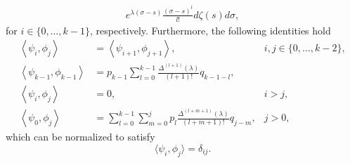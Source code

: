 \begin{proposition}
\begin{equation}
\begin{aligned}
    e^{\lambda(\sigma-s)}\frac{(\sigma-s)^{l}}{l!} d\zeta(s) d\sigma,
\end{aligned}
\end{equation}
for $i \in \{0,\dots, k-1\}$, respectively.
Furthermore, the following identities hold
%
\begin{equation}
\label{btdde:eq:eigenfunction_identities}
\begin{aligned}
\left<\psi_i,\phi_j\right> & = \left<\psi_{i + 1},\phi_{j + 1}\right>, & i,j\in\{0,\dots,k-2\},\\
\left<\psi_{k-1},\phi_{k-1}\right> & = p_{k-1} \sum_{l=0}^{k-1} \frac{\Delta^{(l + 1)}(\lambda)}{(l + 1)!}q_{k-1-l}, \\
\left<\psi_i,\phi_j\right> & = 0, & i>j, \\
\left<\psi_0,\phi_j\right> &= \sum_{l=0}^{k-1} \sum_{m=0}^j p_l \frac{\Delta^{(l + m+1)}(\lambda)}{(l + m+1)!} q_{j-m}, 
                                 & j>0,
\end{aligned}
\end{equation}
which can be normalized to satisfy 
\begin{equation}
    \label{btdde:eq:normalization_identity}
    \langle\psi_i,\phi_j\rangle = \delta_{ij}.
\end{equation}
\end{proposition}

